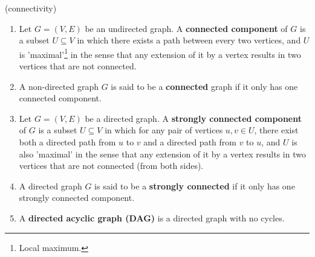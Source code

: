 
\ifdefined\DEFconnectivity
\else
\providecommand{\DEFconnectivity}{DEFconnectivity}


\begin{definition} (connectivity)
  \label{def:connectivity}
\begin{enumerate}
  \item Let $G = (V, E)$ be an undirected graph. A \textbf{connected component} of $G$ is a subset $U \subseteq V$ in which there exists a path between every two vertices, and $U$ is 'maximal'\footnote{Local maximum.} in the sense that any extension of it by a vertex results in two vertices that are not connected.
\item A non-directed graph $G$ is said to be a \textbf{connected} graph if it only has one connected component.
\item Let $G = \left(V, E\right)$ be a directed graph. A \textbf{strongly connected component} of $G$ is a subset $U \subseteq V$ in which for any pair of vertices $u, v \in U$, there exist both a directed path from $u$ to $v$ and a directed path from $v$ to $u$, and $U$ is also 'maximal' in the sense that any extension of it by a vertex results in two vertices that are not connected (from both sides).
\item A directed graph $G$ is said to be a \textbf{strongly connected} if it only has one strongly connected component. 
\item A \textbf{directed acyclic graph (DAG)} is a directed graph with no cycles.
\end{enumerate}
\end{definition}
\fi
